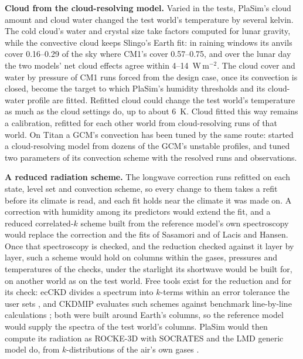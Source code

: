 \textbf{Cloud from the cloud-resolving model.} Varied in the tests, PlaSim's cloud amount and cloud water changed
the test world's temperature by several kelvin. The cold cloud's water and crystal size take factors computed for
lunar gravity, while the convective cloud keeps Slingo's Earth fit: in raining windows its anvils cover 0.16--0.29
of the sky where CM1's cover 0.57--0.75, and over the lunar day the two models' net cloud effects agree within
4--14~W\,m$^{-2}$. The cloud cover and water by pressure of CM1 runs
forced from the design case, once its convection is closed, become the target to which PlaSim's humidity thresholds
and its cloud-water profile are fitted. Refitted cloud could change the test world's temperature as much as the cloud settings do, up to about 6~K.
Cloud fitted this way remains a calibration, refitted for each other world from cloud-resolving runs of that
world. On Titan a GCM's convection has been tuned by the same route: \textcite{rafkin2022interaction}
started a cloud-resolving model from dozens of the GCM's unstable profiles, and \textcite{battalio2022interaction}
tuned two parameters of its convection scheme with the resolved runs and observations.

\textbf{A reduced radiation scheme.} The longwave correction runs refitted on each state, level set and convection
scheme, so every change to them takes a refit before its climate is read, and each fit holds near the climate it was
made on. A correction with
humidity among its predictors would extend the fit, and a reduced correlated-$k$ scheme built from the reference
model's own spectroscopy would replace the correction and the fits of Sasamori and of Lacis and Hansen. Once that spectroscopy is checked, and the reduction checked against it layer by layer, such a scheme would
hold on columns within the gases, pressures and temperatures of the checks, under the starlight its shortwave would
be built for, on another world as on the test world. Free tools exist for the reduction and for its check: ecCKD divides a spectrum into $k$-terms within an error tolerance the
user sets \autocite{hogan2022tool}, and CKDMIP evaluates such schemes against benchmark line-by-line calculations
\autocite{hogan2020evaluating}; both were built around Earth's columns, so the reference model would supply the spectra of the test world's columns. PlaSim would then compute its radiation as ROCKE-3D with SOCRATES and the LMD generic model do, from $k$-distributions of the air's own gases \autocite{tsigaridis2025rocke3d,wordsworth2011gliese}.

